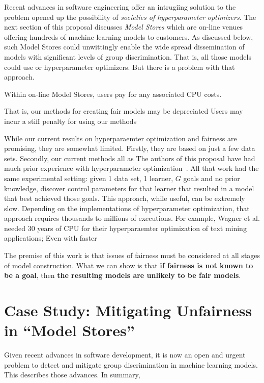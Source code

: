 Recent advances in software engineering offer an intrugiing solution to the problem  opened up the possibility
of {\em societies of hyperparameter optimizers}. The next section of this proposal discusses {\em Model Stores} which are on-line venues offering hundreds of machine learning models to customers. As discussed below, such Model Stores could unwittingly enable the wide spread dissemination of models with significant levels of group discrimination. That is, all those models could use or hyperparameter optimizers. But there is a problem with that approach.
\bi
\item Within on-line Model Stores, users pay for any associated CPU costs. 
\item 
\item 
\item That is, our methods for creating fair models may be depreciated Users may incur a stiff penalty for using our methods
\ei


While our current results on hyperparaemter optimization and fairness are promising, they are somewhat limited. Firstly, they are based on just a  few data sets. Secondly,
our current methods all as
The authors of this proposal have had much prior experience with hyperparameter optimization~\cite{XXX}. All that work
had the same experimental setting: given 1 data set, 1 learner,  $G$ goals and no prior knowledge,
 discover  control parameters for that learner that resulted in a model that best achieved those goals. This approach, while useful, can be extremely slow. Depending on the  implementations of hyperparameter optimization, that approach requires thousands to millions of executions. For example,   Wagner et al. needed 30 years of CPU for their hyperparaemter optimization of text mining applications; Even with faster
 
The premise of this work is that issues of fairness must be considered at all stages
of model construction. What we can show is that
{\bf if fairness is not known to be a goal}, then {\bf the resulting models are unlikely to be fair models}.
\section{Case Study: Mitigating Unfairness in ``Model Stores''}
Given recent advances in software development,
it is now an open and 
urgent problem to detect and mitigate
  group discrimination in machine learning models.
  This describes those advances. In summary,
  
  
  
